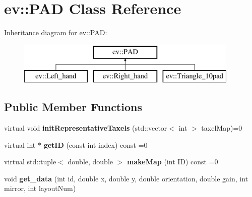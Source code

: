 \hypertarget{classev_1_1PAD}{}\section{ev\+:\+:P\+AD Class Reference}
\label{classev_1_1PAD}
Inheritance diagram for ev\+:\+:P\+AD\+:\begin{figure}[H]
\begin{center}
\leavevmode
\includegraphics[height=2.000000cm]{classev_1_1PAD}
\end{center}
\end{figure}
\subsection*{Public Member Functions}
\begin{DoxyCompactItemize}
\item 
\mbox{\label{classev_1_1PAD_a97c7228c2d197211aba3697c12971396}} 
virtual void {\bfseries init\+Representative\+Taxels} (std\+::vector$<$ int $>$ taxel\+Map)=0
\item 
\mbox{\label{classev_1_1PAD_a46ca58b885f3508c0d2ca78694cc96cf}} 
virtual int $\ast$ {\bfseries get\+ID} (const int index) const =0
\item 
\mbox{\label{classev_1_1PAD_a2e2d128551f76ad51a9f77b25a6710f4}} 
virtual std\+::tuple$<$ double, double $>$ {\bfseries make\+Map} (int ID) const =0
\item 
\mbox{\label{classev_1_1PAD_adb5f0d48ea06f4edda3d3f7cc3e104bc}} 
void {\bfseries get\+\_\+data} (int id, double x, double y, double orientation, double gain, int mirror, int layout\+Num)
\end{DoxyCompactItemize}
